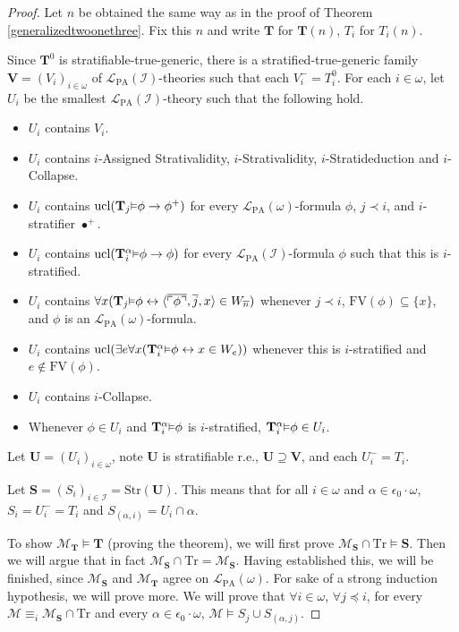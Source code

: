 \documentclass[reqno]{article}
\theoremstyle{definition}
\def\L{\mathscr{L}}
\def\M{\mathscr{M}}
\def\T{\mathbf{T}}
\def\S{\mathbf{S}}
\def\U{\mathbf{U}}
\def\V{\mathbf{V}}
\def\FV{\mathrm{FV}}
\def\LPA{\L_{\mathrm{PA}}}
\def\epom{\epsilon_0\cdot\omega}
\def\indset{\mathcal I}
\def\Tr{\mathrm{Tr}}
\def\ctr{\cap\Tr}
\def\myequiv{\equiv}
\renewcommand{\Pr}[1]{\T_{#1}\mbox{\small${\vDash}$}}
\newcommand{\Prr}[2]{\T^{#1}_{#2}\mbox{\small${\vDash}$}}
\newcommand{\ucl}[1]{\mathrm{ucl}(#1)}
\newcommand{\str}[1]{\mathrm{Str}(#1)} \newcommand{\Str}[1]{\str{#1}}
\begin{document}
\begin{proof}
Let $n$ be obtained the same way as in the proof
of Theorem \ref{generalizedtwoonethree}.
Fix this $n$ and write $\T$ for $\T(n)$, $T_i$ for $T_i(n)$.

Since $\T^0$ is stratifiable-true-generic, there is a stratified-true-generic family $\V=(V_i)_{i\in\omega}$ of $\LPA(\indset)$-theories
such that each $V^-_i=T^0_i$.  For each $i\in\omega$, let $U_i$ be the smallest $\LPA(\indset)$-theory such that the following hold.
\begin{itemize}
\item $U_i$ contains $V_i$.
\item $U_i$ contains $i$-Assigned Strativalidity, $i$-Strativalidity, $i$-Stratideduction and $i$-Collapse.
\item $U_i$ contains $\ucl{\Pr j\phi\rightarrow\phi^+}$ for every $\LPA(\omega)$-formula $\phi$, $j\prec i$, and $i$-stratifier 
  $\bullet^+$.
\item $U_i$ contains $\ucl{\Prr\alpha i\phi\rightarrow\phi}$ for every $\LPA(\indset)$-formula $\phi$ such that this is $i$-stratified.
\item $U_i$ contains $\forall x(\Pr j\phi\leftrightarrow\langle\overline{\ulcorner\phi\urcorner},\overline j,x\rangle\in
  W_{\overline n})$ whenever $j\prec i$, $\FV(\phi)\subseteq\{x\}$, and $\phi$ is an $\LPA(\omega)$-formula.
\item $U_i$ contains
$\ucl{\exists e\forall x(\Prr\alpha i\phi\leftrightarrow x\in W_e)}$
whenever this is $i$-stratified and $e\not\in\FV(\phi)$.
\item $U_i$ contains $i$-Collapse.
\item Whenever $\phi\in U_i$ and $\Prr\alpha i\phi$ is $i$-stratified, $\Prr\alpha i\phi\in U_i$.
\end{itemize}
Let $\U=(U_i)_{i\in\omega}$, note $\U$ is stratifiable r.e., $\U\supseteq\V$, and each $U^-_i=T_i$.

Let $\S=(S_i)_{i\in\indset}=\str\U$.  This means that for all $i\in\omega$ and $\alpha\in\epom$,
$S_i=U^-_i=T_i$ and $S_{(\alpha,i)}=U_i\cap\alpha$.

To show $\M_\T\models\T$ (proving the theorem), we will first prove $\M_\S\ctr\models\S$.  Then we will argue that in fact
$\M_\S\ctr=\M_\S$.  Having established this, we will be finished, since $\M_\S$ and $\M_\T$ agree on $\LPA(\omega)$.
For sake of a strong induction hypothesis, we will prove more.
We will prove that $\forall i\in\omega$, $\forall j\preceq i$, for every $\M\myequiv_i\M_\S\ctr$ and every $\alpha\in\epom$,
$\M\models S_j\cup S_{(\alpha,j)}$.


\end{proof}
\end{document}

